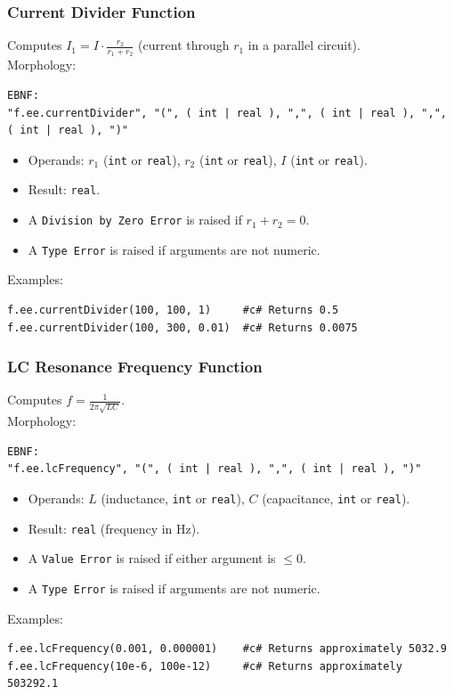 \subsubsection{Current Divider Function}
Computes $I_1 = I \cdot \frac{r_2}{r_1 + r_2}$ (current through $r_1$ in a parallel circuit). \\
Morphology:
\begin{verbatim}
EBNF:
"f.ee.currentDivider", "(", ( int | real ), ",", ( int | real ), ",", ( int | real ), ")"
\end{verbatim}
\begin{itemize}
\item Operands: $r_1$ (\texttt{int} or \texttt{real}), $r_2$ (\texttt{int} or \texttt{real}), $I$ (\texttt{int} or \texttt{real}).
\item Result: \texttt{real}.
\item A \texttt{Division by Zero Error} is raised if $r_1 + r_2 = 0$.
\item A \texttt{Type Error} is raised if arguments are not numeric.
\end{itemize}
Examples:
\begin{verbatim}
f.ee.currentDivider(100, 100, 1)     #c# Returns 0.5
f.ee.currentDivider(100, 300, 0.01)  #c# Returns 0.0075
\end{verbatim}

\subsubsection{LC Resonance Frequency Function}
Computes $f = \frac{1}{2\pi\sqrt{LC}}$. \\
Morphology:
\begin{verbatim}
EBNF:
"f.ee.lcFrequency", "(", ( int | real ), ",", ( int | real ), ")"
\end{verbatim}
\begin{itemize}
\item Operands: $L$ (inductance, \texttt{int} or \texttt{real}), $C$ (capacitance, \texttt{int} or \texttt{real}).
\item Result: \texttt{real} (frequency in Hz).
\item A \texttt{Value Error} is raised if either argument is $\leq 0$.
\item A \texttt{Type Error} is raised if arguments are not numeric.
\end{itemize}
Examples:
\begin{verbatim}
f.ee.lcFrequency(0.001, 0.000001)    #c# Returns approximately 5032.9
f.ee.lcFrequency(10e-6, 100e-12)     #c# Returns approximately 503292.1
\end{verbatim}

